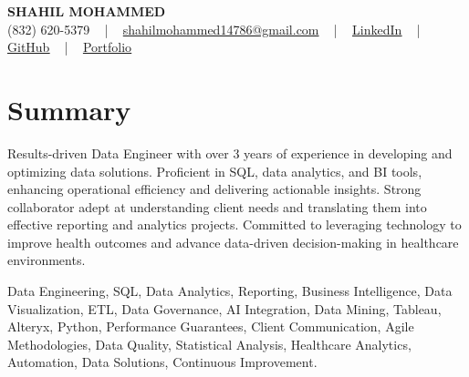 \documentclass[letterpaper,10pt]{article}
\begin{document}
\begin{center}
    {\fontsize{14pt}{12pt}\selectfont \textbf{\MakeUppercase{Shahil Mohammed}}}\\ \vspace{2pt}
    \fontsize{10pt}{12pt}\selectfont (832) 620-5379 ~ | ~ \href{mailto:shahilmohammed14786@gmail.com}{shahilmohammed14786@gmail.com} ~ | ~  
    \href{https://www.linkedin.com/in/shahil-mohammed-9652931a1/}{\color{blue}\underline{LinkedIn}}  ~ | ~ 
    \href{https://github.com/freakbeast14}{\color{blue}\underline{GitHub}} ~ | ~ 
    \href{https://shahil-mohammed.netlify.app/}{\color{blue}\underline{Portfolio}}
    \vspace{-8pt}
\end{center}

\section{Summary}
\vspace{-2pt}\fontsize{8pt}{9pt}\selectfont
Results-driven Data Engineer with over 3 years of experience in developing and optimizing data solutions. Proficient in SQL, data analytics, and BI tools, enhancing operational efficiency and delivering actionable insights. Strong collaborator adept at understanding client needs and translating them into effective reporting and analytics projects. Committed to leveraging technology to improve health outcomes and advance data-driven decision-making in healthcare environments.
 \vspace{-5pt}
 
{\fontsize{1pt}{1pt}\selectfont\color{white}
Data Engineering, SQL, Data Analytics, Reporting, Business Intelligence, Data Visualization, ETL, Data Governance, AI Integration, Data Mining, Tableau, Alteryx, Python, Performance Guarantees, Client Communication, Agile Methodologies, Data Quality, Statistical Analysis, Healthcare Analytics, Automation, Data Solutions, Continuous Improvement.
}
\vspace{-8pt}

\vspace{-2pt}
\end{document}
